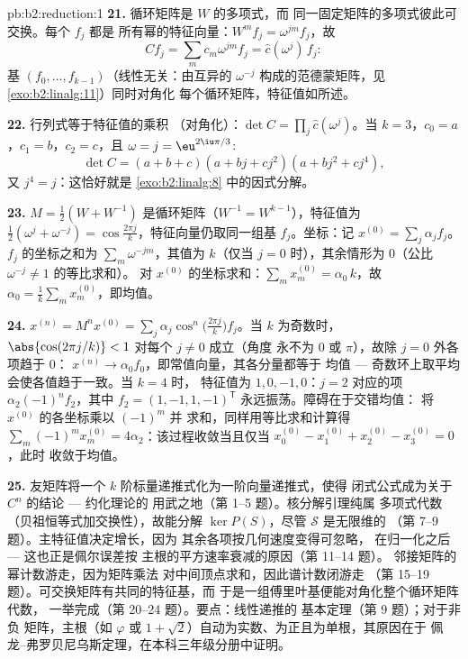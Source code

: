 \begin{solution}{pb:b2:reduction:1}
\textbf{21.} 循环矩阵是 $W$ 的多项式，而
同一固定矩阵的多项式彼此可交换。每个 $f_j$ 都是
所有幂的特征向量：$W^m f_j = \omega^{jm}f_j$，故
\[
Cf_j = \sum_m c_m\omega^{jm} f_j = \widehat c(\omega^j)\,f_j :
\]
基 $(f_0, \dots, f_{k-1})$（线性无关：由互异的
$\omega^{-j}$ 构成的范德蒙矩阵，见\cref{exo:b2:linalg:11}）同时对角化
每个循环矩阵，特征值如所述。

\textbf{22.} 行列式等于特征值的乘积
（对角化）：$\det C = \prod_{j}\widehat c(\omega^j)$。当 $k
= 3$，$c_0 = a$，$c_1 = b$，$c_2 = c$，且 $\omega = j =
\eu^{2\iu\pi/3}$:
\[
\det C = (a + b + c)(a + bj + cj^2)(a + bj^2 + cj^4),
\]
又 $j^4 = j$：这恰好就是
\cref{exo:b2:linalg:8} 中的因式分解。

\textbf{23.} $M = \frac12(W + W^{-1})$ 是循环矩阵（$W^{-1} =
W^{k-1}$），特征值为 $\frac12(\omega^j + \omega^{-j}) =
\cos\frac{2\pi j}k$，特征向量仍取同一组基 $f_j$。坐标：记
$x^{(0)} = \sum_j \alpha_j f_j$。$f_j$ 的坐标之和为
$\sum_m \omega^{-jm}$，其值为 $k$（仅当 $j = 0$
时），其余情形为 $0$（公比 $\omega^{-j} \neq 1$ 的等比求和）。
对 $x^{(0)}$ 的坐标求和：$\sum_m x^{(0)}_m =
\alpha_0\,k$，故 $\alpha_0 = \frac1k\sum_m x^{(0)}_m$，即均值。

\textbf{24.} $x^{(n)} = M^nx^{(0)} = \sum_j
\alpha_j\cos^n\bigl(\tfrac{2\pi j}k\bigr)f_j$。当 $k$ 为奇数时，
$\abs{\cos(2\pi j/k)} < 1$ 对每个 $j \neq 0$ 成立（角度
永不为 $0$ 或 $\pi$），故除 $j = 0$ 外各项趋于 $0$：
$x^{(n)} \to \alpha_0 f_0$，即常值向量，其各分量都等于
均值 --- 奇数环上取平均会使各值趋于一致。当 $k = 4$ 时，
特征值为 $1, 0, -1, 0$：$j = 2$ 对应的项
$\alpha_2(-1)^nf_2$，其中 $f_2 = (1, -1, 1, -1)^{\mathsf T}$
永远振荡。障碍在于交错均值：
将 $x^{(0)}$ 的各坐标乘以 $(-1)^m$ 并
求和，同样用等比求和计算得 $\sum_m
(-1)^mx^{(0)}_m = 4\alpha_2$：该过程收敛当且仅当
$x^{(0)}_0 - x^{(0)}_1 + x^{(0)}_2 - x^{(0)}_3 = 0$，此时
收敛于均值。

\textbf{25.} 友矩阵将一个
$k$ 阶标量递推式化为一阶向量递推式，使得
闭式公式成为关于 $C^n$ 的结论 --- 约化理论的
用武之地（第 1--5 题）。核分解引理纯属
多项式代数（贝祖恒等式加交换性），故能分解
$\ker P(S)$，尽管 $\mathcal{S}$ 是无限维的
（第 7--9 题）。主特征值决定增长，因为
其余各项按几何速度变得可忽略，
在归一化之后 --- 这也正是佩尔误差按
主根的平方速率衰减的原因（第 11--14 题）。
邻接矩阵的幂计数游走，因为矩阵乘法
对中间顶点求和，因此谱计数闭游走
（第 15--19 题）。可交换矩阵有共同的特征基，而
于是一组傅里叶基便能对角化整个循环矩阵代数，
一举完成（第 20--24 题）。要点：线性递推的
基本定理（第 9 题）；对于非负
矩阵，主根（如 $\varphi$ 或 $1 +
\sqrt2$）自动为实数、为正且为单根，其原因在于
佩龙--弗罗贝尼乌斯定理，在本科三年级分册中证明。
\end{solution}
